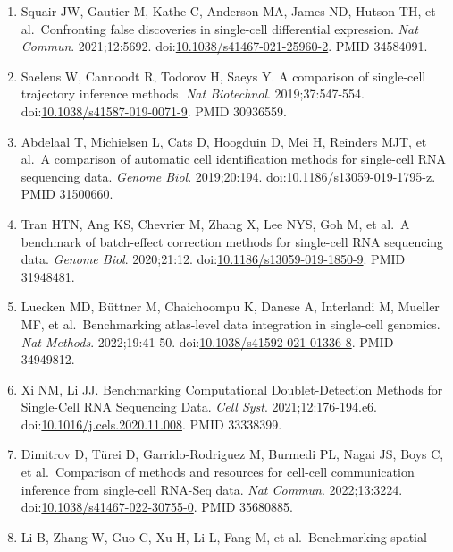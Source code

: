 \documentclass{article}
\begin{document}
\begin{enumerate}
  Soneson C, Robinson MD. Bias, robustness and scalability in
  single-cell differential expression analysis. \emph{Nat Methods}.
  2018;15:255-261.
  doi:\href{https://doi.org/10.1038/nmeth.4612}{10.1038/nmeth.4612}.
  PMID 29481549.
\item
  Squair JW, Gautier M, Kathe C, Anderson MA, James ND, Hutson TH, et
  al.~Confronting false discoveries in single-cell differential
  expression. \emph{Nat Commun}. 2021;12:5692.
  doi:\href{https://doi.org/10.1038/s41467-021-25960-2}{10.1038/s41467-021-25960-2}.
  PMID 34584091.
\item
  Saelens W, Cannoodt R, Todorov H, Saeys Y. A comparison of single-cell
  trajectory inference methods. \emph{Nat Biotechnol}. 2019;37:547-554.
  doi:\href{https://doi.org/10.1038/s41587-019-0071-9}{10.1038/s41587-019-0071-9}.
  PMID 30936559.
\item
  Abdelaal T, Michielsen L, Cats D, Hoogduin D, Mei H, Reinders MJT, et
  al.~A comparison of automatic cell identification methods for
  single-cell RNA sequencing data. \emph{Genome Biol}. 2019;20:194.
  doi:\href{https://doi.org/10.1186/s13059-019-1795-z}{10.1186/s13059-019-1795-z}.
  PMID 31500660.
\item
  Tran HTN, Ang KS, Chevrier M, Zhang X, Lee NYS, Goh M, et al.~A
  benchmark of batch-effect correction methods for single-cell RNA
  sequencing data. \emph{Genome Biol}. 2020;21:12.
  doi:\href{https://doi.org/10.1186/s13059-019-1850-9}{10.1186/s13059-019-1850-9}.
  PMID 31948481.
\item
  Luecken MD, Büttner M, Chaichoompu K, Danese A, Interlandi M, Mueller
  MF, et al.~Benchmarking atlas-level data integration in single-cell
  genomics. \emph{Nat Methods}. 2022;19:41-50.
  doi:\href{https://doi.org/10.1038/s41592-021-01336-8}{10.1038/s41592-021-01336-8}.
  PMID 34949812.
\item
  Xi NM, Li JJ. Benchmarking Computational Doublet-Detection Methods for
  Single-Cell RNA Sequencing Data. \emph{Cell Syst}. 2021;12:176-194.e6.
  doi:\href{https://doi.org/10.1016/j.cels.2020.11.008}{10.1016/j.cels.2020.11.008}.
  PMID 33338399.
\item
  Dimitrov D, Türei D, Garrido-Rodriguez M, Burmedi PL, Nagai JS, Boys
  C, et al.~Comparison of methods and resources for cell-cell
  communication inference from single-cell RNA-Seq data. \emph{Nat
  Commun}. 2022;13:3224.
  doi:\href{https://doi.org/10.1038/s41467-022-30755-0}{10.1038/s41467-022-30755-0}.
  PMID 35680885.
\item
  Li B, Zhang W, Guo C, Xu H, Li L, Fang M, et al.~Benchmarking spatial

\end{enumerate}
\end{document}
